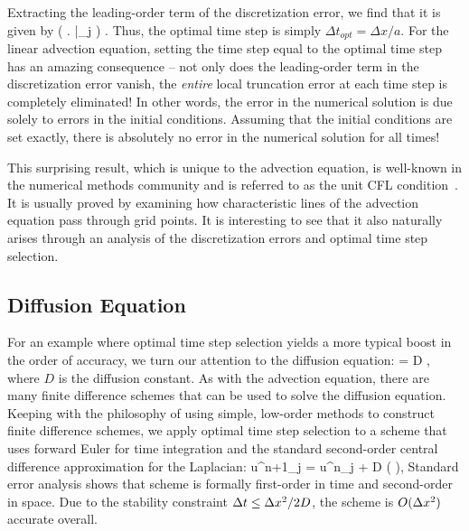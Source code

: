 \documentclass[oneeqnum,onefignum,onetabnum,onethmnum]{siamltex}
\begin{document}
Extracting the leading-order term of the discretization error, we find that 
it is given by
\beq
  \left( \left.   \right|_j \right)
  \left[ \dx - a \dt \right] \dt.
\eeq
Thus, the optimal time step is simply $\Delta t_{opt} = \Delta x / a$.
For the linear advection equation, setting the time step equal to the optimal 
time step has an amazing consequence -- not only does the leading-order term
in the discretization error vanish, the \emph{entire} local truncation 
error at each time step is completely eliminated!  In other words, the error 
in the numerical solution is due solely to errors in the initial conditions.
Assuming that the initial conditions are set exactly, there is absolutely no 
error in the numerical solution for all times!  

This surprising result, which is unique to the advection equation, is 
well-known in the numerical methods community and is referred to as the unit 
CFL condition~\cite{leveque_book_2002}.  It is usually proved by examining 
how characteristic lines of the advection equation pass through grid points.  
It is interesting to see that it also naturally arises through an analysis of 
the discretization errors and optimal time step selection.


\subsection{Diffusion Equation}
For an example where optimal time step selection yields a more typical boost 
in the order of accuracy, we turn our attention to the diffusion equation:
\beq
   = D ,
  \label{eq:diffusion_eqn_1d}
\eeq
where $D$ is the diffusion constant.  As with the advection equation,
there are many finite difference schemes that can be used to solve the 
diffusion equation.  Keeping with the philosophy of using simple, low-order 
methods to construct finite difference schemes, we apply optimal time step 
selection to a scheme that uses forward Euler for time integration and the 
standard second-order central difference approximation for the Laplacian:
\beq
  u^{n+1}_j = u^{n}_j 
  + D \dt 
    \left(  \right),
  \label{eq:diffusion_eqn_1d_FD_scheme}
\eeq
Standard error analysis shows that scheme is formally first-order in time and 
second-order in space.  Due to the stability constraint 
$\Delta t \le \Delta x^2/2D$, the scheme is $O(\Delta x^2)$ accurate overall.
\end{document}
